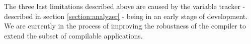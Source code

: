 The three last limitations described above are caused by the variable tracker - described in section \ref{section:analyzer} - being in an early stage of development.
We are currently in the process of improving the robustness of the compiler to extend the subset of compilable applications.

